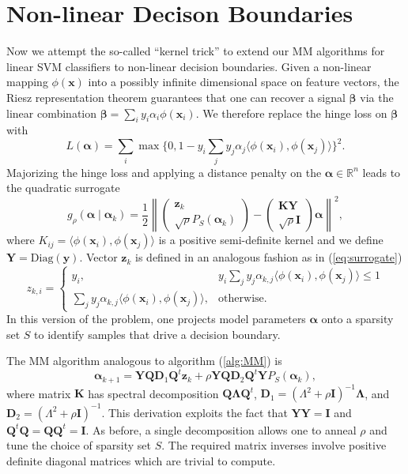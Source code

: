 \documentclass[11pt]{article}
\newcommand{\bx}{\boldsymbol{x}}
\newcommand{\by}{\boldsymbol{y}}
\newcommand{\bz}{\boldsymbol{z}}
\newcommand{\bD}{\boldsymbol{D}}
\newcommand{\bI}{\boldsymbol{I}}
\newcommand{\bK}{\boldsymbol{K}}
\newcommand{\bQ}{\boldsymbol{Q}}
\newcommand{\bY}{\boldsymbol{Y}}
\newcommand{\balpha}{\boldsymbol{\alpha}}
\newcommand{\bbeta}{\boldsymbol{\beta}}
\newcommand{\bLambda}{\boldsymbol{\Lambda}}
\begin{document}
\section*{\center Non-linear Decison Boundaries}
Now we attempt the so-called ``kernel trick'' to extend our MM algorithms for linear SVM classifiers to non-linear decision boundaries.
Given a non-linear mapping $\phi(\bx)$ into a possibly infinite dimensional space on feature vectors, the Riesz representation theorem guarantees that one can recover a signal $\bbeta$ via the linear combination $\bbeta = \sum_{i} y_{i} \alpha_{i} \phi(\bx_{i})$. We therefore replace the hinge loss on $\bbeta$ with
\[
    L(\balpha) = \sum_{i} \max\{0, 1-y_{i} \sum_{j} y_{j} \alpha_{j} \langle \phi(\bx_{i}), \phi(\bx_{j})\rangle\}^{2}.
\]
Majorizing the hinge loss and applying a distance penalty on the $\balpha \in \mathbb{R}^{n}$ leads to the quadratic surrogate
\begin{equation}
    \label{eq:nlsurrogate}
    g_{\rho}(\balpha \mid \balpha_{k})
    =
    \frac{1}{2} \left\|
    \begin{pmatrix}
        \bz_{k} \\ \sqrt{\rho} P_{S}(\balpha_{k})
    \end{pmatrix}
    -
    \begin{pmatrix}
        \bK \bY \\ \sqrt{\rho} \bI
    \end{pmatrix}
    \balpha
    \right\|^{2},
\end{equation}
where $K_{ij} = \langle \phi(\bx_{i}), \phi(\bx_{j}) \rangle$ is a positive semi-definite kernel and we define $\bY = \mathrm{Diag}(\by)$.
Vector $\bz_{k}$ is defined in an analogous fashion as in (\ref{eq:surrogate})
\[
    z_{k,i} = \begin{cases}
        y_{i}, & y_{i} \sum_{j} y_{j} \alpha_{k,j} \langle \phi(\bx_{i}), \phi(\bx_{j})\rangle \le 1 \\
        \sum_{j} y_{j} \alpha_{k,j} \langle \phi(\bx_{i}), \phi(\bx_{j})\rangle, & \text{otherwise}.
    \end{cases}
\]
In this version of the problem, one projects model parameters $\balpha$ onto a sparsity set $S$ to identify samples that drive a decision boundary.

The MM algorithm analogous to algorithm (\ref{alg:MM}) is
\begin{equation}
    \label{alg:nlMM}
    \balpha_{k+1}
    =
    \bY \bQ \bD_{1} \bQ^{t} \bz_{k} + \rho \bY \bQ \bD_{2} \bQ^{t} \bY P_{S}(\balpha_{k}),
\end{equation}
where matrix $\bK$ has spectral decomposition $\bQ \bLambda \bQ^{t}$, $\bD_{1} = (\Lambda^{2} + \rho \bI)^{-1} \bLambda$, and $\bD_{2} = (\Lambda^{2} + \rho \bI)^{-1}$.
This derivation exploits the fact that $\bY \bY = \bI$ and $\bQ^{t} \bQ = \bQ \bQ^{t} = \bI$.
As before, a single decomposition allows one to anneal $\rho$ and tune the choice of sparsity set $S$.
The required matrix inverses involve positive definite diagonal matrices which are trivial to compute.
\end{document}
